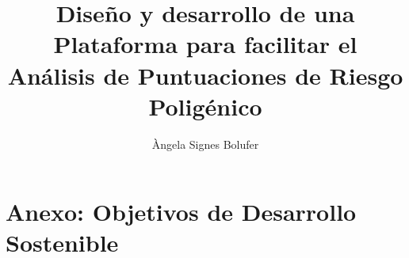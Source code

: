 \documentclass[11pt,spanish,listoffigures,listoftables]{tfgetsinf}
\title{Diseño y desarrollo de una Plataforma para facilitar el \\
      Análisis de Puntuaciones de Riesgo Poligénico}
\author{Àngela Signes Bolufer}
\begin{document}




\mainmatter
















\APPENDIX
\chapter{Anexo: Objetivos de Desarrollo Sostenible}


\end{document}

